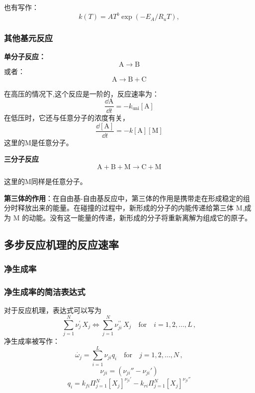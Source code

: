 也有写作：
\begin{equation}
    k(T)=A T^{b}\exp(-E_{A}/R_{u}T),
\end{equation}

\subsubsection{其他基元反应}

\textbf{单分子反应：}
\begin{equation}
    \mathrm{A\rightarrow B}
\end{equation}
或者：
\begin{equation}
    \mathrm{A}\rightarrow \mathrm{B} + \mathrm{C}
\end{equation}

在高压的情况下,这个反应是一阶的，反应速率为：
\begin{equation}
    \frac{\dd \mathrm{A}}{\dd t}=-k_{\mathrm{uni}}[\mathrm{A}]
\end{equation}
在低压时，它还与任意分子的浓度有关，
\begin{equation}
    \frac{\dd[\mathrm{A}]}{\dd t}=-k[\mathrm{A}][\mathrm{M}]
\end{equation}这里的M是任意分子。

\textbf{三分子反应}
\begin{equation}
    \mathrm{A + B + M \rightarrow C + M}
\end{equation}

这里的M同样是任意分子。

\textbf{第三体的作用}：在自由基-自由基反应中，第三体的作用是携带走在形成稳定的组分时释放出来的能量。在碰撞的过程中，新形成的分子的内能传递给第三体 M,成为 M 的动能。没有这一能量的传递，新形成的分子将重新离解为组成它的原子。

\subsection{多步反应机理的反应速率}
\subsubsection{净生成率}
\subsubsection{净生成率的简洁表达式}
对于反应机理，表达式可以写为
\begin{equation}
    \sum_{j=1}^{N}\nu_{j}^{\prime}\,X_{j}\Leftrightarrow\sum_{j=1}^{N}\nu_{j i}^{\prime\prime}\,X_{j}\quad{\mathrm{for}}\quad i=1,2,\dots,L\,,
\end{equation}
净生成率被写作：
\begin{equation}
    \dot{\omega_j}=\sum_{i=1}^L\nu_{ji} q_i\quad{\mathrm{for}}\quad j=1,2,\dots,N\,,
\end{equation}
\begin{equation}
    \nu_{ji} = (\nu_{ji}'' - \nu_{ji}')
\end{equation}
\begin{equation}
    q_i = k_{fi}\Pi_{j=1}^N[X_j]^{\nu_{ji}'} - k_{ri}\Pi_{j=1}^N[X_j]^{\nu_{ji}''}
\end{equation}

